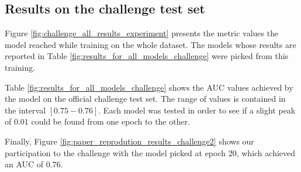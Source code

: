 \subsection{Results on the challenge test set}
\setlength{\marginparwidth}{1.5cm}\leavevmode {}Figure \ref{fig:challenge_all_results_experiment} presents the metric values the model reached while training on the whole dataset. The models whose results are reported in Table \ref{fig:results_for_all_models_challenge} were picked from this training.

Table \ref{fig:results_for_all_models_challenge} shows the AUC values achieved by the model on the official challenge test set. The range of values is contained in the interval $[0.75-0.76]$. Each model was tested in order to see if a slight peak of $0.01$ could be found from one epoch to the other.

Finally, Figure \ref{fig:paper_reprodution_results_challenge2} shows our participation to the challenge with the model picked at epoch 20, which achieved an AUC of $0.76$.

\newpage

